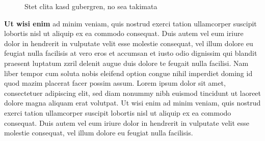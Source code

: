 \begin{figure}
    \hfill%
    \hfill%
    \caption{Stet clita kasd gubergren, no sea takimata}
    \label{fig:test3}
\end{figure}

\textbf{Ut wisi enim} ad minim veniam, quis nostrud exerci tation ullamcorper suscipit lobortis nisl ut aliquip ex ea commodo consequat. Duis autem vel eum iriure dolor in hendrerit in vulputate velit esse molestie consequat, vel illum dolore eu feugiat nulla facilisis at vero eros et accumsan et iusto odio dignissim qui blandit praesent luptatum zzril delenit augue duis dolore te feugait nulla facilisi.
Nam liber tempor cum soluta nobis eleifend option congue nihil imperdiet doming id quod mazim placerat facer possim assum. Lorem ipsum dolor sit amet, consectetuer adipiscing elit, sed diam nonummy nibh euismod tincidunt ut laoreet dolore magna aliquam erat volutpat. Ut wisi enim ad minim veniam, quis nostrud exerci tation ullamcorper suscipit lobortis nisl ut aliquip ex ea commodo consequat.
Duis autem vel eum iriure dolor in hendrerit in vulputate velit esse molestie consequat, vel illum dolore eu feugiat nulla facilisis.



